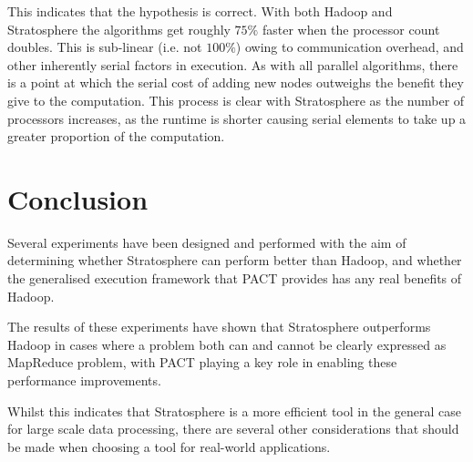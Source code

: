 This indicates that the hypothesis is correct. With both Hadoop and Stratosphere the algorithms get roughly $75\%$ faster when the processor count doubles. This is sub-linear (i.e. not $100\%$) owing to communication overhead, and other inherently serial factors in execution. As with all parallel algorithms, there is a point at which the serial cost of adding new nodes outweighs the benefit they give to the computation. This process is clear with Stratosphere as the number of processors increases, as the runtime is shorter causing serial elements to take up a greater proportion of the computation.

\section{Conclusion}
Several experiments have been designed and performed with the aim of determining whether Stratosphere can perform better than Hadoop, and whether the generalised execution framework that PACT provides has any real benefits of Hadoop. 

The results of these experiments have shown that Stratosphere outperforms Hadoop in cases where a problem both can and cannot be clearly expressed as MapReduce problem, with PACT playing a key role in enabling these performance improvements. 

Whilst this indicates that Stratosphere is a more efficient tool in the general case for large scale data processing, there are several other considerations that should be made when choosing a tool for real-world applications.